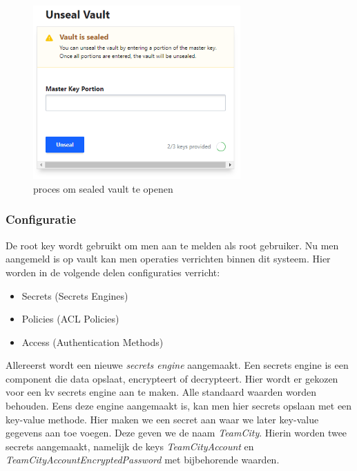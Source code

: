 \begin{figure}[htbp]
\centerline{\includegraphics[width=300]{bachproef/img/poc/unsealVault.png}}
\caption{proces om sealed vault te openen \autocite{vault}}
\end{figure}

\subsubsection{Configuratie}
\label{ch:config}

De root key wordt gebruikt om men aan te melden als root gebruiker. Nu men aangemeld is op vault kan men operaties verrichten binnen dit systeem. Hier worden in de volgende delen configuraties verricht:
\begin{itemize}
    \item Secrets (Secrets Engines)
    \item Policies (ACL Policies)
    \item Access (Authentication Methods)
\end{itemize}

Allereerst wordt een nieuwe \textit{secrets engine} aangemaakt. Een secrets engine is een component die data opslaat, encrypteert of decrypteert. Hier wordt er gekozen voor een kv secrets engine aan te maken. Alle standaard waarden worden behouden. Eens deze engine aangemaakt is, kan men hier secrets opslaan met een key-value methode. Hier maken we een secret aan waar we later key-value gegevens aan toe voegen. Deze geven we de naam \textit{TeamCity}. Hierin worden twee secrets aangemaakt, namelijk de keys \textit{TeamCityAccount} en \textit{TeamCityAccountEncryptedPassword} met bijbehorende waarden.
\newline

